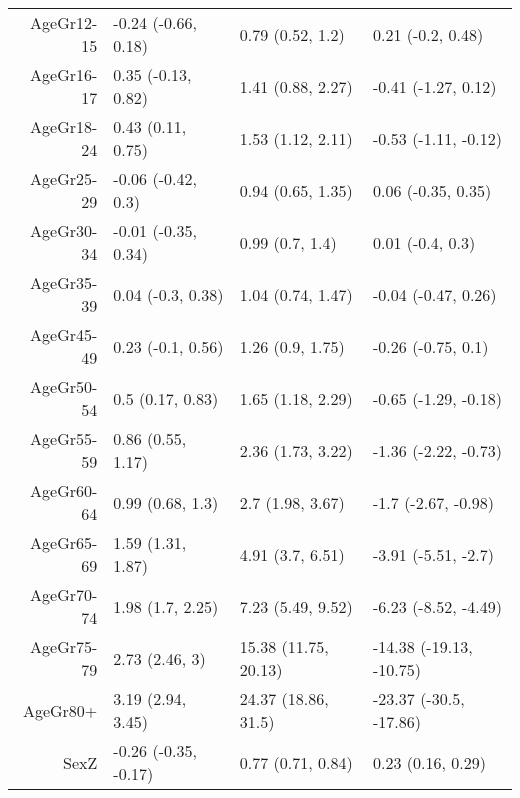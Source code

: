 \begin{table}[ht]
\begin{tabular}{rlll}
  AgeGr12-15 & -0.24 (-0.66, 0.18) & 0.79 (0.52, 1.2) & 0.21 (-0.2, 0.48) \\ 
  AgeGr16-17 & 0.35 (-0.13, 0.82) & 1.41 (0.88, 2.27) & -0.41 (-1.27, 0.12) \\ 
  AgeGr18-24 & 0.43 (0.11, 0.75) & 1.53 (1.12, 2.11) & -0.53 (-1.11, -0.12) \\ 
  AgeGr25-29 & -0.06 (-0.42, 0.3) & 0.94 (0.65, 1.35) & 0.06 (-0.35, 0.35) \\ 
  AgeGr30-34 & -0.01 (-0.35, 0.34) & 0.99 (0.7, 1.4) & 0.01 (-0.4, 0.3) \\ 
  AgeGr35-39 & 0.04 (-0.3, 0.38) & 1.04 (0.74, 1.47) & -0.04 (-0.47, 0.26) \\ 
  AgeGr45-49 & 0.23 (-0.1, 0.56) & 1.26 (0.9, 1.75) & -0.26 (-0.75, 0.1) \\ 
  AgeGr50-54 & 0.5 (0.17, 0.83) & 1.65 (1.18, 2.29) & -0.65 (-1.29, -0.18) \\ 
  AgeGr55-59 & 0.86 (0.55, 1.17) & 2.36 (1.73, 3.22) & -1.36 (-2.22, -0.73) \\ 
  AgeGr60-64 & 0.99 (0.68, 1.3) & 2.7 (1.98, 3.67) & -1.7 (-2.67, -0.98) \\ 
  AgeGr65-69 & 1.59 (1.31, 1.87) & 4.91 (3.7, 6.51) & -3.91 (-5.51, -2.7) \\ 
  AgeGr70-74 & 1.98 (1.7, 2.25) & 7.23 (5.49, 9.52) & -6.23 (-8.52, -4.49) \\ 
  AgeGr75-79 & 2.73 (2.46, 3) & 15.38 (11.75, 20.13) & -14.38 (-19.13, -10.75) \\ 
  AgeGr80+ & 3.19 (2.94, 3.45) & 24.37 (18.86, 31.5) & -23.37 (-30.5, -17.86) \\ 
  SexZ & -0.26 (-0.35, -0.17) & 0.77 (0.71, 0.84) & 0.23 (0.16, 0.29) \\ 
   \hline
\end{tabular}
\end{table}
